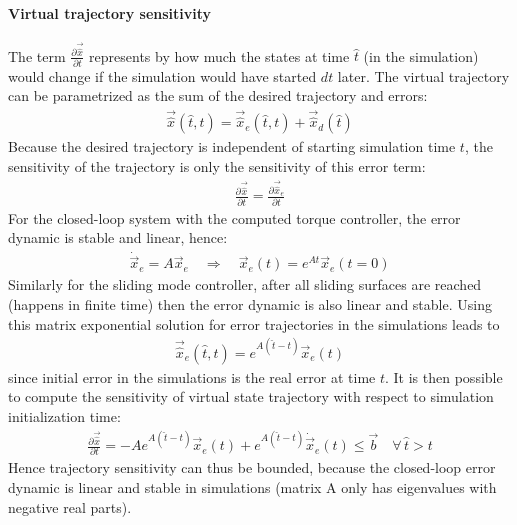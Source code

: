 \paragraph{Virtual trajectory sensitivity}
%
The term $\frac{\partial \vec{\hat{x}}}{\partial t}$ represents by how much the states at time $\hat{t}$ (in the simulation) would change if the simulation would have started $dt$ later. 
%
The virtual trajectory can be parametrized as the sum of the desired trajectory and errors:
%
\begin{align}
\vec{\hat{x}}( \hat{t} , t ) =  \vec{\hat{x}}_e( \hat{t} , t ) + \vec{\hat{x}}_d( \hat{t} )
\end{align}
%
Because the desired trajectory is independent of starting simulation time $t$, the sensitivity of the trajectory is only the sensitivity of this error term:
%
\begin{align}
\frac{\partial \vec{\hat{x}}}{\partial t}  = \frac{\partial \vec{\hat{x}}_e}{\partial t}
\end{align}
%
%
For the closed-loop system with the computed torque controller, the error dynamic is stable and linear, hence:
%
\begin{align}
\dot{\vec{x}}_e = A \vec{x}_e  \quad \Rightarrow \quad  \vec{x}_e( t ) = e^{A t} \vec{x}_e(t=0)
\end{align}
%
Similarly for the sliding mode controller, after all sliding surfaces are reached (happens in finite time) then the error dynamic is also linear and stable.
%
Using this matrix exponential solution for error trajectories in the simulations leads to 
%
\begin{align}
\vec{\hat{x}}_e( \hat{t} , t ) = e^{A (\hat{t} - t )} \vec{x}_e(t)  
\end{align}
%
since initial error in the simulations is the real error at time $t$. It is then possible to compute the sensitivity of virtual state trajectory with respect to simulation initialization time:
%
\begin{align}
\frac{\partial \vec{\hat{x}}}{\partial t}  = -A e^{A (\hat{t} - t )} \vec{x}_e(t) + e^{A (\hat{t} - t )} \dot{\vec{x}}_e(t) \leq \vec{b} \quad \forall \, \hat{t} > t
\end{align}
%
Hence trajectory sensitivity can thus be bounded, because the closed-loop error dynamic is linear and stable in simulations (matrix A only has eigenvalues with negative real parts).  

